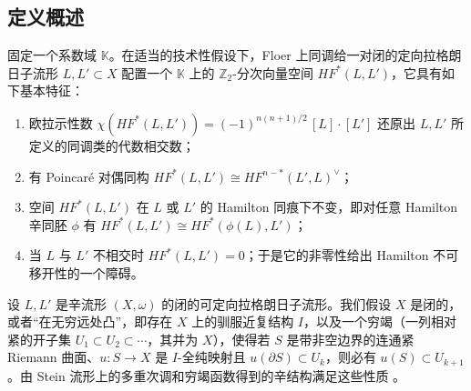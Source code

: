 \documentclass[11pt,a4paper]{article}
\numberwithin{equation}{section}
\newcommand{\bZ}{\mathbb{Z}}
\newcommand{\bK}{\mathbb{K}}
\begin{document}
\subsection{定义概述}

固定一个系数域 $\bK$。在适当的技术性假设下，Floer 上同调给一对闭的定向拉格朗日子流形 $L, L' \subset X$ 配置一个 $\bK$ 上的 $\bZ_2$-分次向量空间 $HF^*(L,L')$，它具有如下基本特征：
\begin{enumerate}
\item 欧拉示性数 $\chi(HF^*(L,L')) = (-1)^{n(n+1)/2}\, [L]\cdot[L']$ 还原出 $L, L'$ 所定义的同调类的代数相交数；
\item 有 Poincar\'e 对偶同构 $HF^*(L,L') \cong HF^{n-*}(L',L)^{\vee}$；
\item 空间 $HF^*(L,L')$ 在 $L$ 或 $L'$ 的 Hamilton 同痕下不变，即对任意 Hamilton 辛同胚 $\phi$ 有 $HF^*(L,L') \cong HF^*(\phi(L), L')$；
\item 当 $L$ 与 $L'$ 不相交时 $HF^*(L, L') = 0$；于是它的非零性给出 Hamilton 不可移开性的一个障碍。
\end{enumerate}

设 $L, L'$ 是辛流形 $(X,\omega)$ 的闭的可定向拉格朗日子流形。我们假设 $X$ 是闭的，或者“在无穷远处凸”，即存在 $X$ 上的驯服近复结构 $I$，以及一个穷竭（一列相对紧的开子集 $U_1 \subset U_2 \subset \cdots$，其并为 $X$），使得若 $S$ 是带非空边界的连通紧 Riemann 曲面、$u: S \rightarrow X$ 是 $I$-全纯映射且 $u(\partial S) \subset U_k$，则必有 $u(S) \subset U_{k+1}$。由 Stein 流形上的多重次调和穷竭函数得到的辛结构满足这些性质 \cite{CieliebakEliashberg}。
\end{document}
